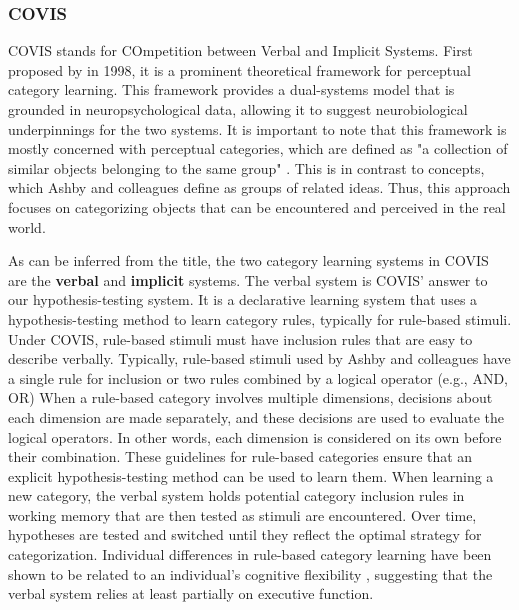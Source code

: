 \documentclass[../dissertation.tex]{subfiles}
\begin{document}
\subsubsection{COVIS}
COVIS stands for COmpetition between Verbal and Implicit Systems. First proposed by \citeauthor{Ashby1998} in 1998, it is a prominent theoretical framework for perceptual category learning. This framework provides a dual-systems model that is grounded in neuropsychological data, allowing it to suggest neurobiological underpinnings for the two systems. It is important to note that this framework is mostly concerned with perceptual categories, which are defined as "a collection of similar objects belonging to the same group" \citep[~p. 151]{Ashby2005}. This is in contrast to concepts, which Ashby and colleagues define as groups of related ideas. Thus, this approach focuses on categorizing objects that can be encountered and perceived in the real world. \par
	As can be inferred from the title, the two category learning systems in COVIS are the \textbf{verbal} and \textbf{implicit} systems. The verbal system is COVIS' answer to our hypothesis-testing system. It is a declarative learning system that uses a hypothesis-testing method to learn category rules, typically for rule-based stimuli. Under COVIS, rule-based stimuli must have inclusion rules that are easy to describe verbally. Typically, rule-based stimuli used by Ashby and colleagues have a single rule for inclusion or two rules combined by a logical operator (e.g., AND, OR)  When a rule-based category involves multiple dimensions, decisions about each dimension are made separately, and these decisions are used to evaluate the logical operators. In other words, each dimension is considered on its own before their combination. These guidelines for rule-based categories ensure that an explicit hypothesis-testing method can be used to learn them. When learning a new category, the verbal system holds potential category inclusion rules in working memory that are then tested as stimuli are encountered. Over time, hypotheses are tested and switched until they reflect the optimal strategy for categorization. Individual differences in rule-based category learning have been shown to be related to an individual's cognitive flexibility \citep{Reetzke2016}, suggesting that the verbal system relies at least partially on executive function. \par
\end{document}
